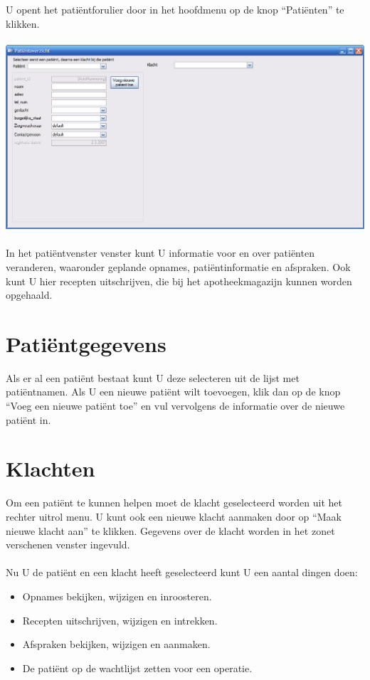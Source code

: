 U opent het pati\"entforulier door in het hoofdmenu op de knop ``Pati\"enten''
te klikken.\\
\\
\includegraphics[scale=.5,angle=0]{patient1} \\
\\
In het pati\"entvenster venster kunt U informatie voor en over pati\"enten veranderen,
waaronder geplande opnames, pati\"entinformatie en afspraken. Ook kunt U hier recepten uitschrijven, die bij het apotheekmagazijn kunnen worden opgehaald.

\section{Pati\"entgegevens}
Als er al een pati\"ent bestaat kunt U deze selecteren uit de lijst met pati\"entnamen. Als U een nieuwe pati\"ent wilt toevoegen, klik dan op de knop ``Voeg een nieuwe pati\"ent toe'' en vul vervolgens de informatie over de nieuwe pati\"ent in.

\section{Klachten} \label{sec:klachten}
Om een pati\"ent te kunnen helpen moet de klacht geselecteerd worden uit het rechter uitrol menu. U kunt ook een nieuwe klacht aanmaken door op ``Maak nieuwe klacht aan'' te klikken. Gegevens over de klacht worden in het zonet verschenen venster ingevuld.\\
\\
Nu U de pati\"ent en een klacht heeft geselecteerd kunt U een aantal dingen
doen:
\begin{itemize}
  \item Opnames bekijken, wijzigen en inroosteren.
  \item Recepten uitschrijven, wijzigen en intrekken.
  \item Afspraken bekijken, wijzigen en aanmaken.
  \item De pati\"ent op de wachtlijst zetten voor een operatie.
\end{itemize}

